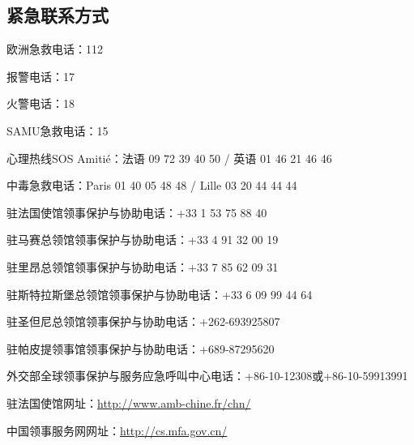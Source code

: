 \subsection{紧急联系方式}

欧洲急救电话：112

报警电话：17 

火警电话：18 

SAMU急救电话：15 

心理热线SOS Amitié：法语 09 72 39 40 50 / 英语 01 46 21 46 46

中毒急救电话：Paris 01 40 05 48 48 / Lille 03 20 44 44 44

驻法国使馆领事保护与协助电话：+33 1 53 75 88 40

驻马赛总领馆领事保护与协助电话：+33 4 91 32 00 19

驻里昂总领馆领事保护与协助电话：+33 7 85 62 09 31

驻斯特拉斯堡总领馆领事保护与协助电话：+33 6 09 99 44 64

驻圣但尼总领馆领事保护与协助电话：+262-693925807

驻帕皮提领事馆领事保护与协助电话：+689-87295620

外交部全球领事保护与服务应急呼叫中心电话：+86-10-12308或+86-10-59913991

驻法国使馆网址：\href{http://www.amb-chine.fr/chn/}{http://www.amb-chine.fr/chn/} 

中国领事服务网网址：\href{http://cs.mfa.gov.cn/}{http://cs.mfa.gov.cn/}
